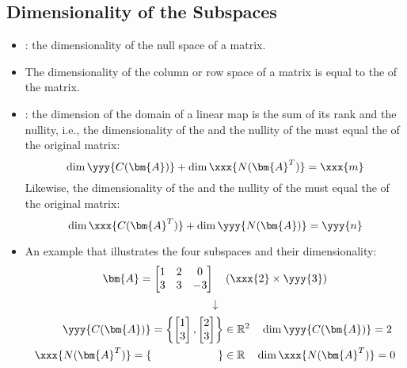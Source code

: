 \begin{itemize}
  \subsection{Dimensionality of the Subspaces}\label{Dimensionality of the Subspaces}
  \begin{itemize}
    \item {}: the dimensionality of the null space of a matrix.
    \item The dimensionality of the column or row space of a matrix is equal to the \hyperref[Rank Terminology]{} of the matrix.
    \item {}: the dimension of the domain of a linear map is the sum of its rank and the nullity, i.e., the dimensionality of the  and the nullity of the  must equal the  of the original matrix: 
    \[%
      \dim{\yyy{C(\bm{A})}} + \dim{\xxx{N(\bm{A}^T)}} = \xxx{m}
    \]%
    Likewise, the dimensionality of the  and the nullity of the  must equal the  of the original matrix:
    \[%
      \dim{\xxx{C(\bm{A}^T)}} + \dim{\yyy{N(\bm{A})}} = \yyy{n}
    \]%
    \item An example that illustrates the four subspaces and their dimensionality:
    \[%
    \bm{A} = \begin{bmatrix}
      1 & 2 & 0 \\
      3 & 3 & -3
      \end{bmatrix} \quad (\xxx{2}\times\yyy{3})
    \]%
    \[%
    \downarrow
    \]%
    \begin{align*}
      \yyy{C(\bm{A})} = \left\{ 
        \begin{bmatrix} 1 \\ 3 \end{bmatrix},
        \begin{bmatrix} 2 \\ 3 \end{bmatrix}
      \right\} &\in \mathbb{R}^2 \quad \dim{\yyy{C(\bm{A})}} = 2 \\
      \xxx{N(\bm{A}^T)} = \left\{\hspace{60pt}\right\} &\in \mathbb{R} \quad \dim{\xxx{N(\bm{A}^T)}} = 0 \\

\end{align*}
\end{itemize}
\end{itemize}
